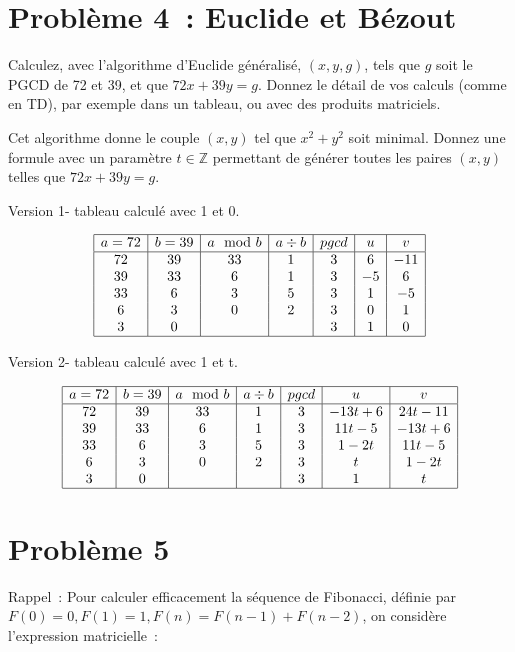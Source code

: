 \documentclass[11pt]{article}
\def\Z{\mathbb Z}
\begin{document}
\section{Problème 4~: Euclide et Bézout}
Calculez, avec l'algorithme d'Euclide généralisé, $(x, y, g)$, tels que $g$ soit le PGCD de 72 et 39, 
et que
$72x+39y=g$. 
Donnez le détail de vos calculs (comme en TD), par exemple dans un tableau, ou avec des produits matriciels.

Cet algorithme donne le couple $(x, y)$ tel que
$x^2+y^2$ soit minimal.  
Donnez une formule avec un paramètre $t\in\Z$  permettant de générer toutes les paires  $(x, y)$ telles
que $72x+39y=g$. 

Version 1- tableau calculé avec 1 et 0.

$$\begin{array}{|c|c|c|c|c|c|c|}
\hline
a=72 & b=39 & a\mod b & a\div b & pgcd &u & v \\
\hline
72 & 39 & 33 & 1 & 3 & 6 & -11 \\
 39 & 33  & 6 & 1 & 3 & -5 & 6  \\
33  & 6   & 3 & 5  & 3 & 1 & -5  \\
 6   & 3   & 0 & 2  & 3 & 0     & 1  \\
 3   & 0   &   &    & 3 & 1     & 0  \\
\hline
\end{array}
$$


Version 2- tableau calculé avec 1 et t.

$$\begin{array}{|c|c|c|c|c|c|c|}
\hline
a=72 & b=39 & a\mod b & a\div b & pgcd &u & v \\
\hline
72 & 39 & 33 & 1 & 3 & -13t+6 & 24t-11 \\
 39 & 33  & 6 & 1 & 3 & 11t-5 & -13t+6  \\
33  & 6   & 3 & 5  & 3 & 1-2t & 11t-5  \\
 6   & 3   & 0 & 2  & 3 & t     & 1-2t  \\
 3   & 0   &   &    & 3 & 1     & t  \\
\hline
\end{array}
$$


\section{Problème 5}
Rappel~: Pour calculer efficacement la séquence de Fibonacci, définie par
$F(0)=0, F(1)=1, F(n)= F(n-1)+F(n-2)$, on considère l'expression matricielle~:
\end{document}
